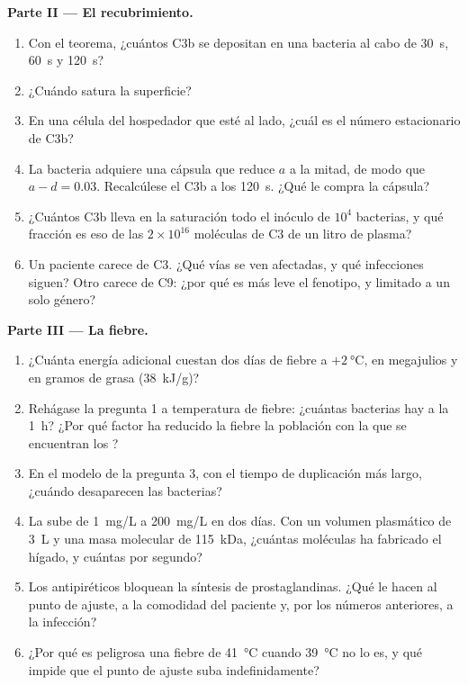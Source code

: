 \begin{problem}
\medskip
\noindent\textbf{Parte II --- El recubrimiento.}
\begin{enumerate}[resume]
  \item Con el teorema, ¿cuántos C3b se depositan en una bacteria al cabo
        de \qty{30}{s}, \qty{60}{s} y \qty{120}{s}?
  \item ¿Cuándo satura la superficie?
  \item En una célula del hospedador que esté al lado, ¿cuál es el número
        estacionario de C3b?
  \item La bacteria adquiere una cápsula que reduce $a$ a la mitad, de
        modo que $a -
        d = 0.03$. Recalcúlese el C3b a los \qty{120}{s}. ¿Qué le compra
        la cápsula?
  \item ¿Cuántos C3b lleva en la saturación todo el inóculo de $10^{4}$
        bacterias, y qué fracción es eso de las $2\times 10^{16}$
        moléculas de C3 de un litro de plasma?
  \item Un paciente carece de C3. ¿Qué vías se ven afectadas, y qué
        infecciones siguen? Otro carece de C9: ¿por qué es más leve el
        fenotipo, y limitado a un solo género?
\end{enumerate}

\medskip
\noindent\textbf{Parte III --- La fiebre.}
\begin{enumerate}[resume]
  \item ¿Cuánta energía adicional cuestan dos días de fiebre a
        $+\qty{2}{\celsius}$, en megajulios y en gramos de grasa
        (\qty{38}{kJ/g})?
  \item Rehágase la pregunta 1 a temperatura de fiebre: ¿cuántas
        bacterias hay a la \qty{1}{h}? ¿Por qué factor ha reducido la
        fiebre la población con la que se encuentran los ?
  \item En el modelo de la pregunta 3, con el tiempo de duplicación más
        largo, ¿cuándo desaparecen las bacterias?
  \item La  sube de \qty{1}{mg/L} a \qty{200}{mg/L} en
        dos días. Con un volumen plasmático de \qty{3}{L} y una masa
        molecular de \qty{115}{kDa}, ¿cuántas moléculas ha fabricado el
        hígado, y cuántas por segundo?
  \item Los antipiréticos bloquean la síntesis de prostaglandinas. ¿Qué
        le hacen al punto de ajuste, a la comodidad del paciente y, por
        los números anteriores, a la infección?
  \item ¿Por qué es peligrosa una fiebre de \qty{41}{\celsius} cuando
        \qty{39}{\celsius} no lo es, y qué impide que el punto de ajuste
        suba indefinidamente?
\end{enumerate}


\end{problem}

